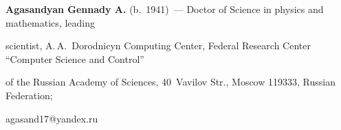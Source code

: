 









\Contrl





\noindent


\textbf{Agasandyan Gennady A.} (b.\ 1941)~--- Doctor of Science in physics and mathematics, leading 


scientist, A.\,A.~Dorodnicyn Computing Center, Federal Research Center ``Computer Science and Control'' 


of the Russian Academy of Sciences, 40~Vavilov Str., Moscow 119333, Russian Federation; 


\mbox{agasand17@yandex.ru}





   


\label{end\stat}





\renewcommand{\bibname}{\protect\rm Литература}  


   


